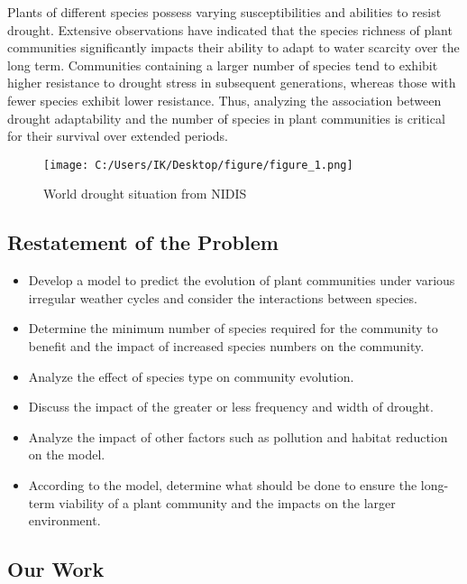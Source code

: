 \documentclass{mcmthesis}
\begin{document}
Plants of different species possess varying susceptibilities and abilities to resist drought. Extensive observations have indicated that the species richness of plant communities significantly impacts their ability to adapt to water scarcity over the long term. Communities containing a larger number of species tend to exhibit higher resistance to drought stress in subsequent generations, whereas those with fewer species exhibit lower resistance. Thus, analyzing the association between drought adaptability and the number of species in plant communities is critical for their survival over extended periods.
\begin{figure}[htbp]
	\centering
	\texttt{[image: C:/Users/IK/Desktop/figure/figure\_1.png]}
	\caption{ World drought situation from NIDIS}
	\label{figure_1}
\end{figure}
\subsection{Restatement of the Problem}
\begin{itemize}
	\item  Develop a model to predict the evolution of plant communities under various irregular weather cycles and consider the interactions between species.
	\item  Determine the minimum number of species required for the community to benefit and the
	      impact of increased species numbers on the community.
	\item  Analyze the effect of species type on community evolution.
	\item  Discuss the impact of the greater or less frequency and width of drought.
	\item  Analyze the impact of other factors such as pollution and habitat reduction on the model.
	\item According to the model, determine what should be done to ensure the long-term viability of
	      a plant community and the impacts on the larger environment.
\end{itemize}
\subsection{Our Work}
\end{document}
